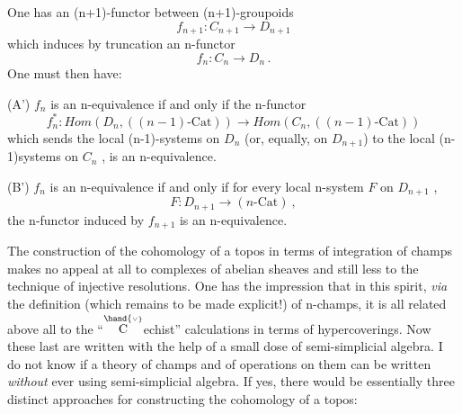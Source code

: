 
One has an (n+1)-functor between (n+1)-groupoids
\[ f_{n+1} : C_{n+1} \longrightarrow D_{n+1} \]
which induces by truncation an n-functor
\[ f_n : C_n \longrightarrow D_n \, . \]
One must then have:

(A') $f_n$ is an n-equivalence if and only if the n-functor
\[ f_n^{*} : \mathit{Hom}(D_n, ((n-1)\text{-Cat})) \longrightarrow \mathit{Hom}(C_n, ((n-1)\text{-Cat})) \]
which sends the local (n-1)-systems on $D_n$ (or, equally, on $D_{n+1}$)
to the local (n-1)systems on $C_n$ , is an n-equivalence.

(B') $f_n$ is an n-equivalence if and only if for every local n-system $F$
on $D_{n+1}$ ,
\[ F : D_{n+1} \longrightarrow (n\text{-Cat}) \ , \]
the n-functor induced by $f_{n+1}$
is an n-equivalence.

The construction of the cohomology of a topos in terms of integration
of champs makes no appeal at all to complexes of abelian sheaves and still
less to the technique of injective resolutions. One has the impression that
in this spirit, \textit{via} the definition (which remains to be made explicit!) of
n-champs, it is all related above all to the ``$\overset{\hand{\scriptscriptstyle\vee}}{\mathrm C}$echist'' calculations in terms
of hypercoverings. Now these last are written with the help of a small dose
of semi-simplicial algebra. I do not know if a theory of champs and of
operations on them can be written \textit{without} ever using semi-simplicial algebra.
If yes, there would be essentially three distinct approaches for constructing
the cohomology of a topos:

